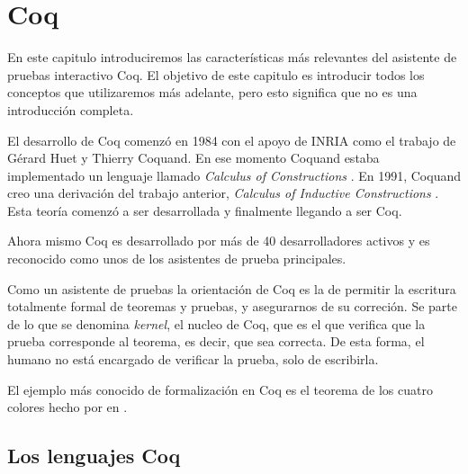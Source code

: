 \chapter{Coq}\label{ch:coq}
En este capitulo introduciremos las características más relevantes del asistente de pruebas interactivo Coq. El objetivo de este capitulo es introducir todos los conceptos que utilizaremos más adelante, pero esto significa que no es una introducción completa.

El desarrollo de Coq comenzó en 1984 con el apoyo de INRIA como el trabajo de Gérard Huet y Thierry Coquand. En ese momento Coquand estaba implementado un lenguaje llamado \emph{Calculus of Constructions} \cite{DBLP:journals/iandc/CoquandH88}.
En 1991, Coquand creo una derivación del trabajo anterior, \emph{Calculus of Inductive Constructions} \cite{CIC}. Esta teoría comenzó a ser desarrollada y finalmente llegando a ser Coq.

Ahora mismo Coq es desarrollado por más de 40 desarrolladores activos y es reconocido como unos de los asistentes de prueba principales.

Como un asistente de pruebas la orientación de Coq es la de permitir la escritura totalmente formal de teoremas y pruebas, y asegurarnos de su correción. Se parte de lo que se denomina \textit{kernel}, el nucleo de Coq, que es el que verifica que la prueba corresponde al teorema, es decir, que sea correcta. De esta forma, el humano no está encargado de verificar la prueba, solo de escribirla.

El ejemplo más conocido de formalización en Coq es el teorema de los cuatro colores \cite{DBLP:conf/ascm/Gonthier07} hecho por \citeauthor{DBLP:conf/ascm/Gonthier07} en \citeyear{DBLP:conf/ascm/Gonthier07}.

\section{Los lenguajes Coq}

